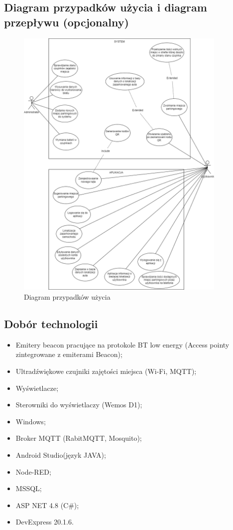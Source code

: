 \documentclass[12pt,a4paper]{article}
\begin{document}
\subsection{Diagram przypadków użycia i diagram przepływu (opcjonalny)}
\begin{figure}[htb!p]
\begin{center}
\includegraphics[width=0.9\textwidth]{Untitled Diagram.drawio.png}
\caption{Diagram przypadków użycia}
\end{center}
\end{figure}

\subsection{Dobór technologii}
\begin{itemize}
\item Emitery beacon pracujące na protokole BT low energy (Access pointy zintegrowane z emiterami Beacon);
\item Ultradźwiękowe czujniki zajętości miejsca (Wi-Fi, MQTT);
\item Wyświetlacze;
\item Sterowniki do wyświetlaczy (Wemos D1);
\item Windows;
\item Broker MQTT (RabitMQTT, Mosquito);
\item Android Studio(język JAVA);
\item Node-RED;
\item MSSQL;
\item ASP NET 4.8  (C\#);
\item DevExpress 20.1.6.
\end{itemize}
\end{document}
